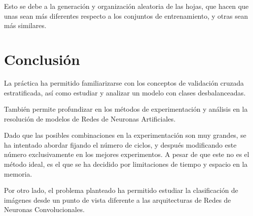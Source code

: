 \documentclass{uc3mpracticas}
\begin{document}
\vspace{1mm}

Esto se debe a la generación y organización aleatoria de las hojas, que hacen que unas sean más diferentes respecto a los conjuntos de entrenamiento, y otras sean más similares.



\section{Conclusión}


La práctica ha permitido familiarizarse con los conceptos de validación cruzada estratificada, así como estudiar y analizar un modelo con clases desbalanceadas.

\vspace{2mm}

También permite profundizar en los métodos de experimentación y análisis en la resolución de modelos de Redes de Neuronas Artificiales.

\vspace{4mm}

Dado que las posibles combinaciones en la experimentación son muy grandes, se ha intentado abordar fijando el número de ciclos, y después modificando este número exclusivamente en los mejores experimentos. A pesar de que este no es el método ideal, es el que se ha decidido por limitaciones de tiempo y espacio en la memoria.

\vspace{2mm}

Por otro lado, el problema planteado ha permitido estudiar la clasificación de imágenes desde un punto de vista diferente a las arquitecturas de Redes de Neuronas Convolucionales.
\end{document}
